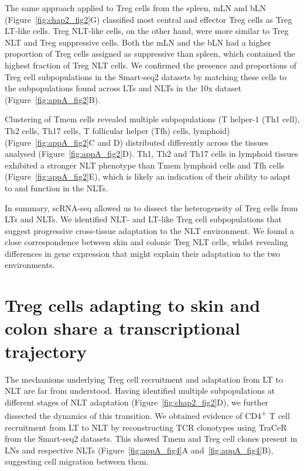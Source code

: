 The same approach applied to Treg cells from the spleen, mLN and bLN (Figure~\ref{fig:chap2_fig2}G) classified most central and effector Treg cells as Treg LT-like cells. Treg NLT-like cells, on the other hand, were more similar to Treg NLT and Treg suppressive cells. Both the mLN and the bLN had a higher proportion of Treg cells assigned as suppressive than spleen, which contained the highest fraction of Treg NLT cells. We confirmed the presence and proportions of Treg cell subpopulations in the Smart-seq2 datasets by matching these cells to the subpopulations found across LTs and NLTs in the 10x dataset (Figure~\ref{fig:appA_fig2}B).

Clustering of Tmem cells revealed multiple subpopulations (T helper-1 (Th1 cell), Th2 cells, Th17 cells, T follicular helper (Tfh) cells, lymphoid) (Figure~\ref{fig:appA_fig2}C and D) distributed differently across the tissues analysed (Figure~\ref{fig:appA_fig2}D). Th1, Th2 and Th17 cells in lymphoid tissues exhibited a stronger NLT phenotype than Tmem lymphoid cells and Tfh cells (Figure~\ref{fig:appA_fig2}E), which is likely an indication of their ability to adapt to and function in the NLTs.

In summary, scRNA-seq allowed us to dissect the heterogeneity of Treg cells from LTs and NLTs. We identified NLT- and LT-like Treg cell subpopulations that suggest progressive cross-tissue adaptation to the NLT environment. We found a close correspondence between skin and colonic Treg NLT cells, whilst revealing differences in gene expression that might explain their adaptation to the two environments.


\section{Treg cells adapting to skin and colon share a transcriptional trajectory}
\label{section2.4}
The mechanisms underlying Treg cell recruitment and adaptation from LT to NLT are far from understood. Having identified multiple subpopulations at different stages of NLT adaptation (Figure~\ref{fig:chap2_fig2}D), we further dissected the dynamics of this transition. We obtained evidence of CD4\textsuperscript{+} T cell recruitment from LT to NLT by reconstructing TCR clonotypes using TraCeR~\citep{stubbington_t_2016} from the Smart-seq2 datasets. This showed Tmem and Treg cell clones present in LNs and respective NLTs (Figure~\ref{fig:appA_fig4}A and~\ref{fig:appA_fig4}B), suggesting cell migration between them.

